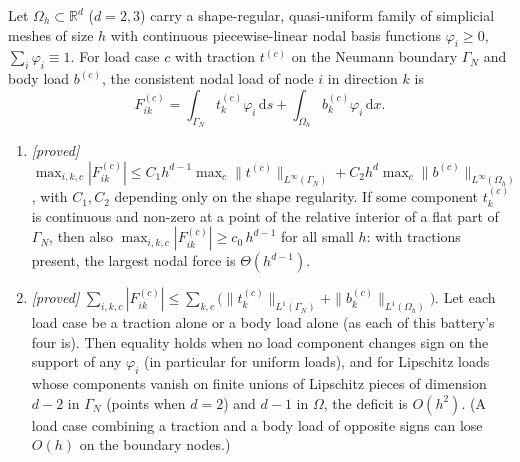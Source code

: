 
\begin{lemma}\label{lem:w9-scale}
Let $\Omega_h \subset \mathbb{R}^d$ ($d = 2, 3$) carry a shape-regular,
quasi-uniform family of simplicial meshes of size $h$ with continuous
piecewise-linear nodal basis functions $\varphi_i \ge 0$, $\sum_i \varphi_i
\equiv 1$. For load case $c$ with traction $t^{(c)}$ on the Neumann boundary
$\Gamma_N$ and body load $b^{(c)}$, the consistent nodal load of node $i$ in
direction $k$ is
\[
  F^{(c)}_{ik} = \int_{\Gamma_N} t^{(c)}_k \varphi_i \,\mathrm{d}s
               + \int_{\Omega_h} b^{(c)}_k \varphi_i \,\mathrm{d}x .
\]
\begin{enumerate}
\item[(a)] \emph{[proved]} $\max_{i,k,c} |F^{(c)}_{ik}| \le C_1 h^{d-1}
  \max_c \|t^{(c)}\|_{L^\infty(\Gamma_N)} + C_2 h^{d} \max_c
  \|b^{(c)}\|_{L^\infty(\Omega_h)}$, with $C_1, C_2$ depending only on the shape
  regularity. If some component $t^{(c)}_k$ is continuous and non-zero at a
  point of the relative interior of a flat part of $\Gamma_N$, then also
  $\max_{i,k,c} |F^{(c)}_{ik}| \ge c_0\, h^{d-1}$ for all small $h$: with
  tractions present, the largest nodal force is $\Theta(h^{d-1})$.
\item[(b)] \emph{[proved]} $\sum_{i,k,c} |F^{(c)}_{ik}| \le \sum_{k,c} \big(
  \|t^{(c)}_k\|_{L^1(\Gamma_N)} + \|b^{(c)}_k\|_{L^1(\Omega_h)} \big)$. Let
  each load case be a traction alone or a body load alone (as each of this
  battery's four is). Then equality holds when no load component changes
  sign on the support of any $\varphi_i$ (in particular for uniform loads),
  and for Lipschitz loads whose components vanish on finite unions of
  Lipschitz pieces of dimension $d-2$ in $\Gamma_N$ (points when $d = 2$) and
  $d-1$ in $\Omega$, the deficit is $O(h^2)$. (A load case combining a
  traction and a body load of opposite signs can lose $O(h)$ on the boundary
  nodes.)
\end{enumerate}
\end{lemma}

